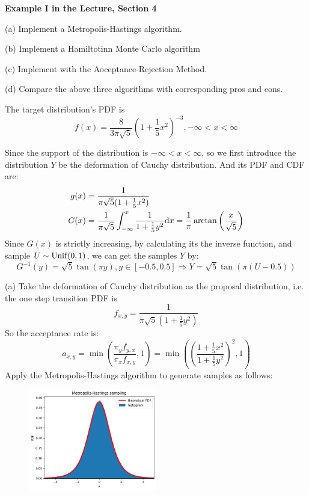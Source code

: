 \begin{homeworkProblem}

\textbf{Example I in the Lecture, Section 4}

(a) Implement a Metropolis-Hastings algorithm.

(b) Implement a Hamiltotinn Monte Carlo algorithm

(c) Implement with the Aoceptance-Rejection Method.

(d) Compare the above three algorithms with corresponding pros and cons.

\solution

The target distribution's PDF is
$$f(x)=\dfrac{8}{3\pi\sqrt{5}}\left(1+\dfrac{1}{5}x^2\right)^{-3}, -\infty<x<\infty$$

Since the support of the distribution is $-\infty<x<\infty$, so we first introduce the distribution $Y$ be the deformation of Cauchy distribution. And its PDF and CDF are:
\begin{align*}
g(x) &= \dfrac{1}{\pi\sqrt{5}(1+\frac{1}{5}x^2)} \\
G(x) &= \dfrac{1}{\pi\sqrt{5}}\int_{-\infty}^{x}\dfrac{1}{1+\frac{1}{5}y^2}\mathrm{d}x=\dfrac{1}{\pi}\arctan\left(\dfrac{x}{\sqrt{5}}\right)
\end{align*}
Since $G(x)$ is strictly increasing, by calculating its the inverse function, and sample $U\sim\operatorname{Unif}(0,1)$, we can get the samples $Y$ by:
$$G^{-1}(y) = \sqrt{5}\tan(\pi y), y\in[-0.5,0.5] \Rightarrow Y = \sqrt{5}\tan(\pi (U-0.5))$$

(a) Take the deformation of Cauchy distribution as the proposal distribution, i.e. the one step transition PDF is
$$f_{x,y} = \dfrac{1}{\pi\sqrt{5}(1+\frac{1}{5}y^2)}$$
So the acceptance rate is:
$$a_{x,y}=\min\left(\dfrac{\pi_yf_{y,x}}{\pi_xf_{x,y}},1\right)=\min\left(\left(\dfrac{1+\frac{1}{5}x^2}{1+\frac{1}{5}y^2}\right)^2,1\right)$$
Apply the Metropolis-Hastings algorithm to generate samples as follows:
\begin{figure}[h]
    \centering
    \includegraphics[width=0.5\textwidth]{./figure/p10/MH.png}
\end{figure}


\end{homeworkProblem}
